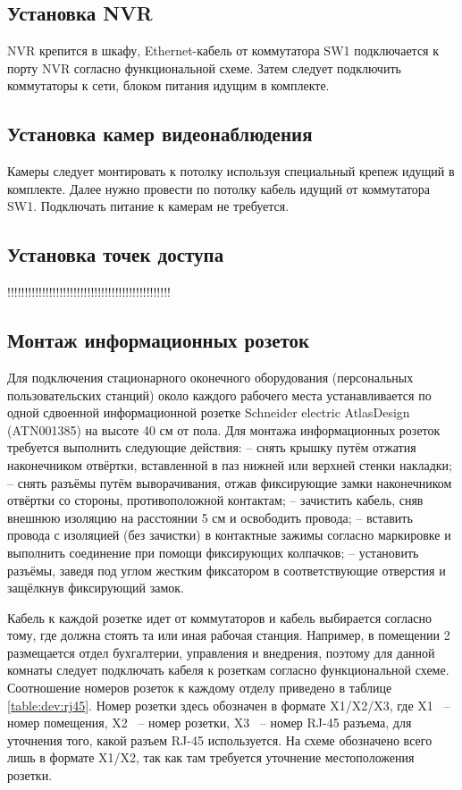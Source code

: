 \subsection{Установка NVR}

NVR крепится в шкафу, Ethernet-кабель от коммутатора SW1 подключается к порту NVR согласно функциональной схеме.
Затем следует подключить коммутаторы к сети, блоком питания идущим в комплекте.

\subsection{Установка камер видеонаблюдения}

Камеры следует монтировать к потолку используя специальный крепеж идущий в комплекте. Далее 
нужно провести по потолку кабель идущий от коммутатора SW1. Подключать питание к камерам не требуется.

\subsection{Установка точек доступа}
!!!!!!!!!!!!!!!!!!!!!!!!!!!!!!!!!!!!!!!!!!!!!!!

\subsection{Монтаж информационных розеток}

Для подключения стационарного оконечного оборудования (персональных пользовательских станций) около каждого рабочего места устанавливается 
по одной сдвоенной информационной розетке Schneider electric AtlasDesign (ATN001385) на высоте 40 см от пола. Для монтажа информационных розеток 
требуется выполнить следующие действия:
– снять крышку путём отжатия наконечником отвёртки, вставленной в паз нижней или верхней стенки накладки;
– снять разъёмы путём выворачивания, отжав фиксирующие замки наконечником отвёртки со стороны, противоположной контактам;
– зачистить кабель, сняв внешнюю изоляцию на расстоянии 5 см и освободить провода;
– вставить провода с изоляцией (без зачистки) в контактные зажимы согласно маркировке и выполнить соединение при помощи фиксирующих колпачков;
– установить разъёмы, заведя под углом жестким фиксатором в соответствующие отверстия и защёлкнув фиксирующий замок.

Кабель к каждой розетке идет от коммутаторов и кабель выбирается согласно тому, где должна стоять та или иная рабочая станция.
Например, в помещении 2 размещается отдел бухгалтерии, управления и внедрения, поэтому для данной комнаты следует подключать кабеля к розеткам 
согласно функциональной схеме. Соотношение номеров розеток к каждому отделу приведено в таблице \ref{table:dev:rj45}. Номер розетки 
здесь обозначен в формате X1/X2/X3, где X1 ~-- номер помещения, X2 ~-- номер розетки, X3 ~-- номер RJ-45 разъема, для уточнения того,
какой разъем RJ-45 используется. На схеме обозначено всего лишь в формате X1/X2, так как там требуется уточнение местоположения розетки.

